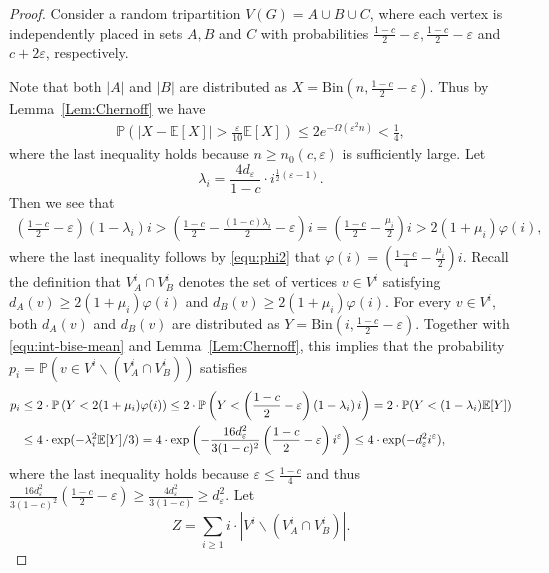 \documentclass{aic}
\def\Bin{\mathrm{Bin}}
\newcommand{\E}{{\mathbb{E}}}
\newcommand{\Prob}{{\mathbb{P}}}
\begin{document}
	\begin{proof}
		Consider a random tripartition $V(G)=A\cup B\cup C$, where each vertex is independently placed in sets $A, B$ and $C$
		with probabilities $\frac{1-c}{2}-\varepsilon,  \frac{1-c}{2}-\varepsilon$ and $c+2\varepsilon$, respectively.
		
		Note that both $|A|$ and $|B|$ are distributed as $X=\Bin(n,\frac{1-c}{2}-\varepsilon)$.
		Thus by Lemma~\ref{Lem:Chernoff} we have
		\begin{align}
			\label{equ:chern1}
			\Prob\left(|X-\E[X]|>\frac{\varepsilon}{10}\E[X]\right)\leq 2e^{-\Omega(\varepsilon^2n)}< \frac14,
		\end{align}
		where the last inequality holds because $n\geq n_0(c,\varepsilon)$ is sufficiently large.
		Let $$\lambda_i=\frac{4d_\varepsilon}{1-c}\cdot i^{\frac{1}{2}(\varepsilon-1)}.$$
		Then we see that
		\begin{align}\label{equ:int-bise-mean}
			\left(\frac{1-c}{2}-\varepsilon\right)\left(1-\lambda_i\right)i>\left(\frac{1-c}{2}-\frac{(1-c)\lambda_i}{2}-\varepsilon\right)i=\left(\frac{1-c}{2}-\frac{\mu_i}{2}\right) i> 2(1+\mu_i)\varphi(i),
		\end{align}
		where the last inequality follows by \eqref{equ:phi2} that $\varphi(i)=\left(\frac{1-c}{4}-\frac{\mu_i}{2}\right)i$.
		Recall the definition that $V^i_A\cap V^i_B$ denotes the set of vertices $v\in V^i$ satisfying $d_A(v)\ge 2(1+\mu_i)\varphi(i)$ and $d_B(v)\ge 2(1+\mu_i)\varphi(i)$.
		For every $v\in V^i$, both $d_A(v)$ and $d_B(v)$ are distributed as $Y=\Bin(i,\frac{1-c}{2}-\varepsilon)$.
		Together with \eqref{equ:int-bise-mean} and Lemma~\ref{Lem:Chernoff}, this implies that the probability $p_i=\Prob\left(v\in V^i\backslash (V^i_A\cap V^i_B)\right)$ satisfies
		\begin{align}\notag
			p_i&\leq 2\cdot\Prob\left(Y< 2(1+\mu_i)\varphi(i)\right)\le 2\cdot \Prob\left(Y<\left(\frac{1-c}{2}-\varepsilon\right)\left(1-\lambda_i\right)i\right)=2\cdot\Prob(Y< (1-\lambda_i)\E[Y])\\
			&\leq 4\cdot \exp(-\lambda_i^2\E[Y]/3)=4\cdot \exp\left(-\frac{16d_\varepsilon^2}{3(1-c)^2}\left(\frac{1-c}{2}-\varepsilon\right)i^{\varepsilon}\right)\le 4\cdot \exp(-d_\varepsilon^2i^{\varepsilon}),\label{equ:pi}
		\end{align}
		where the last inequality holds because $\varepsilon\leq \frac{1-c}{4}$ and thus $\frac{16d_\varepsilon^2}{3(1-c)^2}\left(\frac{1-c}{2}-\varepsilon\right)\geq \frac{4d_\varepsilon^2}{3(1-c)}\geq d_\varepsilon^2$.
		Let $$Z=\sum_{i\geq 1} i\cdot |V^i\backslash (V^i_A\cap V^i_B)|.$$

\end{proof}
\end{document}
